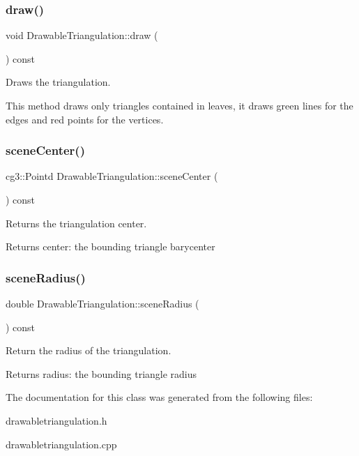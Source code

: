 \subsubsection{\texorpdfstring{draw()}{draw()}}
{\footnotesize\ttfamily void Drawable\+Triangulation\+::draw (\begin{DoxyParamCaption}{ }\end{DoxyParamCaption}) const}



Draws the triangulation. 

This method draws only triangles contained in leaves, it draws green lines for the edges and red points for the vertices. \mbox{\label{classDrawableTriangulation_a3198ae77285c354fd020f5b18df718f5}} 
\subsubsection{\texorpdfstring{scene\+Center()}{sceneCenter()}}
{\footnotesize\ttfamily cg3\+::\+Pointd Drawable\+Triangulation\+::scene\+Center (\begin{DoxyParamCaption}{ }\end{DoxyParamCaption}) const}



Returns the triangulation center. 

\begin{DoxyReturn}{Returns}
center\+: the bounding triangle barycenter 
\end{DoxyReturn}
\mbox{\label{classDrawableTriangulation_a0aee9121b146c327dbbd741c3dc58c0a}} 
\subsubsection{\texorpdfstring{scene\+Radius()}{sceneRadius()}}
{\footnotesize\ttfamily double Drawable\+Triangulation\+::scene\+Radius (\begin{DoxyParamCaption}{ }\end{DoxyParamCaption}) const}



Return the radius of the triangulation. 

\begin{DoxyReturn}{Returns}
radius\+: the bounding triangle radius 
\end{DoxyReturn}


The documentation for this class was generated from the following files\+:\begin{DoxyCompactItemize}
\item 
drawabletriangulation.\+h\item 
drawabletriangulation.\+cpp\end{DoxyCompactItemize}
